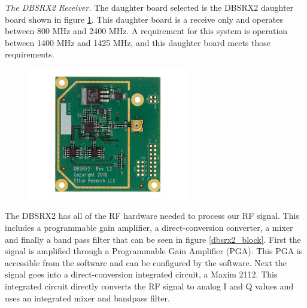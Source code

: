 
\emph{The DBSRX2 Receiver.}  The daughter board selected is the DBSRX2 daughter board shown in figure \ref{dbsrx2}.  This daughter board is a receive only and operates between 800 MHz and 2400 MHz.  A requirement for this system is operation between 1400 MHz and 1425 MHz, and this daughter board meets those requirements.  

{\begin{figure}[h!tb] 
\centering
\includegraphics[width=7cm]{Images/dbsrx2.jpg}
\label{dbsrx2}
\end{figure}
}

The DBSRX2 has all of the RF hardware needed to process our RF signal.  This includes a programmable gain amplifier, a direct-conversion converter, a mixer and finally a band pass filter that can be seen in figure \ref{dbsrx2_block}.  First the signal is amplified through a Programmable Gain Amplifier (PGA).  This PGA is accessible from the software and can be configured by the software.  Next the signal goes into a direct-conversion integrated circuit, a Maxim 2112.  This integrated circuit directly converts the RF signal to analog I and Q values and uses an integrated mixer and bandpass filter.

